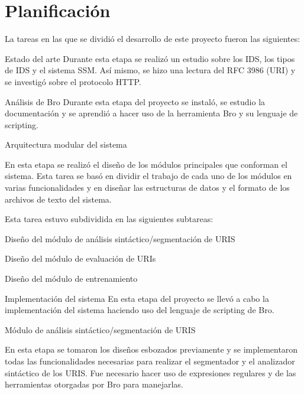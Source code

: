 \section{Planificación}

La tareas en las que se dividió el desarrollo de este proyecto fueron las siguientes:


\begin{legal}
\item Estado del arte
Durante esta etapa se realizó un estudio sobre los IDS, los tipos de IDS y el sistema SSM. Así mismo, se hizo una lectura del RFC 3986 (URI) y se investigó sobre el protocolo HTTP.

\item Análisis de Bro 
Durante esta etapa del proyecto se instaló, se estudio la documentación y se aprendió a hacer uso de la herramienta Bro y su lenguaje de scripting.

\item Arquitectura modular del sistema 

En esta etapa se realizó el diseño de los módulos principales que conforman el sistema. Esta tarea se basó en dividir el trabajo de cada uno de los módulos en varias funcionalidades y en diseñar las estructuras de datos y el formato de los archivos de texto del sistema.

    Esta tarea estuvo subdividida en las siguientes subtareas:

\begin{legal}
\item Diseño del módulo de análisis sintáctico/segmentación de URIS 
\item Diseño del módulo de evaluación de URIs 
\item Diseño del módulo de entrenamiento 
\end{legal}
\item Implementación del sistema 
En esta etapa del proyecto se llevó a cabo la implementación del sistema haciendo uso del lenguaje de scripting de Bro.

\begin{legal}
\item Módulo de análisis sintáctico/segmentación de URIS 

En esta etapa se tomaron los diseños esbozados previamente y se implementaron todas las funcionalidades necesarias para realizar el segmentador y el analizador sintáctico de los URIS. Fue necesario hacer uso de expresiones regulares y de las herramientas otorgadas por Bro para manejarlas.


\end{legal}
\end{legal}
